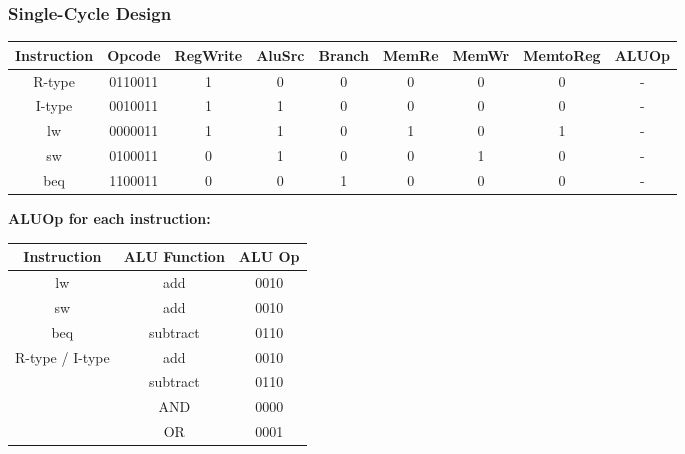 \documentclass[10pt]{article}
\begin{document}
\subsubsection*{Single-Cycle Design}
\begin{tabular}{|c|c|c|c|c|c|c|c|c|}
    \hline
    \textbf{Instruction} & \textbf{Opcode} & \textbf{RegWrite} & \textbf{AluSrc} & \textbf{Branch} & \textbf{MemRe} & \textbf{MemWr} & \textbf{MemtoReg} & \textbf{ALUOp}\\
    \hline
    R-type & 0110011 & 1 & 0 & 0 & 0 & 0 & 0 & -\\
    \hline
    I-type & 0010011 & 1 & 1 & 0 & 0 & 0 & 0 & -\\
    \hline
    lw & 0000011 & 1 & 1 & 0 & 1 & 0 & 1 & -\\
    \hline
    sw & 0100011 & 0 & 1 & 0 & 0 & 1 & 0 & -\\
    \hline
    beq & 1100011 & 0 & 0 & 1 & 0 & 0 & 0 & -\\
    \hline
\end{tabular}

\pagebreak
\noindent\textbf{ALUOp for each instruction:}\\
\begin{tabular}{|c|c|c|}
    \hline
    \textbf{Instruction} & \textbf{ALU Function} & \textbf{ALU Op}\\
    \hline
    lw & add & 0010\\
    \hline
    sw & add & 0010\\
    \hline
    beq & subtract & 0110\\
    \hline
    \multirow{4}{*}{R-type / I-type} & add & 0010 \\\cline{2-3}
                                     & subtract & 0110 \\\cline{2-3}
                                     & AND & 0000 \\\cline{2-3}
                                     & OR & 0001\\
    \hline
\end{tabular}
\end{document}
